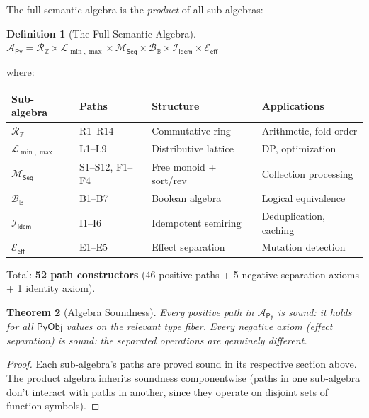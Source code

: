 \documentclass[11pt,a4paper]{report}
\theoremstyle{definition}
\newtheorem{definition}{Definition}[chapter]
\theoremstyle{plain}
\newtheorem{theorem}[definition]{Theorem}
\newcommand{\Int}{\mathbb{Z}}
\newcommand{\Bool}{\mathbb{B}}
\newcommand{\PyObj}{\mathsf{PyObj}}
\begin{document}
The full semantic algebra is the \emph{product} of all sub-algebras:

\begin{definition}[The Full Semantic Algebra]
\label{def:full-algebra}
$\mathcal{A}_\mathsf{Py} = \mathcal{R}_\Int \times \mathcal{L}_{\min,\max}
\times \mathcal{M}_\mathsf{Seq} \times \mathcal{B}_\Bool \times
\mathcal{I}_\mathsf{idem} \times \mathcal{E}_\mathsf{eff}$

where:
\begin{center}
\begin{tabular}{l l l l}
  \textbf{Sub-algebra} & \textbf{Paths} & \textbf{Structure} &
  \textbf{Applications} \\
  \hline
  $\mathcal{R}_\Int$ & R1--R14 & Commutative ring &
    Arithmetic, fold order \\
  $\mathcal{L}_{\min,\max}$ & L1--L9 & Distributive lattice &
    DP, optimization \\
  $\mathcal{M}_\mathsf{Seq}$ & S1--S12, F1--F4 &
    Free monoid + sort/rev &
    Collection processing \\
  $\mathcal{B}_\Bool$ & B1--B7 & Boolean algebra &
    Logical equivalence \\
  $\mathcal{I}_\mathsf{idem}$ & I1--I6 & Idempotent semiring &
    Deduplication, caching \\
  $\mathcal{E}_\mathsf{eff}$ & E1--E5 & Effect separation &
    Mutation detection \\
\end{tabular}
\end{center}

Total: \textbf{52 path constructors} (46 positive paths + 5 negative
separation axioms + 1 identity axiom).
\end{definition}

\begin{theorem}[Algebra Soundness]
Every positive path in $\mathcal{A}_\mathsf{Py}$ is sound: it holds
for all $\PyObj$ values on the relevant type fiber.  Every negative
axiom (effect separation) is sound: the separated operations are
genuinely different.
\end{theorem}

\begin{proof}
Each sub-algebra's paths are proved sound in its respective section
above.  The product algebra inherits soundness componentwise (paths
in one sub-algebra don't interact with paths in another, since they
operate on disjoint sets of function symbols).
\end{proof}
\end{document}
